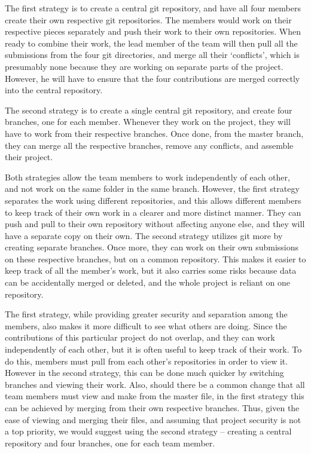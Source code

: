 \documentclass[12pt]{article}
\begin{document}
The first strategy is to create a central git repository, and have all four members create their own respective git repositories. The members would work on their respective pieces separately and push their work to their own repositories. When ready to combine their work, the lead member of the team will then pull all the submissions from the four git directories, and merge all their ‘conflicts’, which is presumably none because they are working on separate parts of the project. However, he will have to ensure that the four contributions are merged correctly into the central repository. 

The second strategy is to create a single central git repository, and create four branches, one for each member. Whenever they work on the project, they will have to work from their respective branches. Once done, from the master branch, they can merge all the respective branches, remove any conflicts, and assemble their project. 

Both strategies allow the team members to work independently of each other, and not work on the same folder in the same branch. However, the first strategy separates the work using different repositories, and this allows different members to keep track of their own work in a clearer and more distinct manner. They can push and pull to their own repository without affecting anyone else, and they will have a separate copy on their own. The second strategy utilizes git more by creating separate branches. Once more, they can work on their own submissions on these respective branches, but on a common repository. This makes it easier to keep track of all the member’s work, but it also carries some risks because data can be accidentally merged or deleted, and the whole project is reliant on one repository. 

The first strategy, while providing greater security and separation among the members, also makes it more difficult to see what others are doing. Since the contributions of this particular project do not overlap, and they can work independently of each other, but it is often useful to keep track of their work. To do this, members must pull from each other’s repositories in order to view it. However in the second strategy, this can be done much quicker by switching branches and viewing their work. Also, should there be a common change that all team members must view and make from the master file, in the first strategy this can be achieved by merging from their own respective branches. Thus, given the ease of viewing and merging their files, and assuming that project security is not a top priority, we would suggest using the second strategy – creating a central repository and four branches, one for each team member. 
\end{document}
